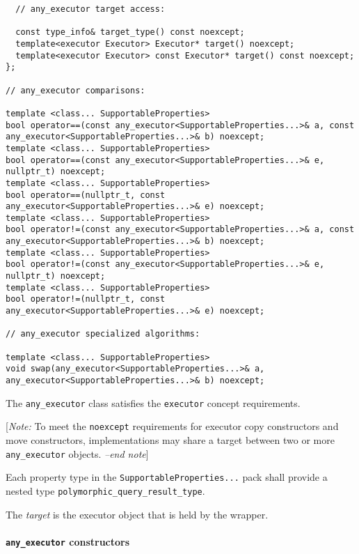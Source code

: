\documentclass[a4paper,12pt,notitlepage,twoside,openright]{article}
\begin{document}
\begin{verbatim}
  // any_executor target access:

  const type_info& target_type() const noexcept;
  template<executor Executor> Executor* target() noexcept;
  template<executor Executor> const Executor* target() const noexcept;
};

// any_executor comparisons:

template <class... SupportableProperties>
bool operator==(const any_executor<SupportableProperties...>& a, const any_executor<SupportableProperties...>& b) noexcept;
template <class... SupportableProperties>
bool operator==(const any_executor<SupportableProperties...>& e, nullptr_t) noexcept;
template <class... SupportableProperties>
bool operator==(nullptr_t, const any_executor<SupportableProperties...>& e) noexcept;
template <class... SupportableProperties>
bool operator!=(const any_executor<SupportableProperties...>& a, const any_executor<SupportableProperties...>& b) noexcept;
template <class... SupportableProperties>
bool operator!=(const any_executor<SupportableProperties...>& e, nullptr_t) noexcept;
template <class... SupportableProperties>
bool operator!=(nullptr_t, const any_executor<SupportableProperties...>& e) noexcept;

// any_executor specialized algorithms:

template <class... SupportableProperties>
void swap(any_executor<SupportableProperties...>& a, any_executor<SupportableProperties...>& b) noexcept;
\end{verbatim}

The \texttt{any_executor} class satisfies the
\texttt{executor} concept requirements.

{[}\emph{Note:} To meet the \texttt{noexcept} requirements
for executor copy constructors and move constructors, implementations
may share a target between two or more \texttt{any_executor}
objects. \emph{--end note}{]}

Each property type in the \texttt{SupportableProperties...}
pack shall provide a nested type
\texttt{polymorphic_query_result_type}.

The \emph{target} is the executor object that is held by the wrapper.

\hypertarget{any_executor-constructors}{%
\paragraph{\texorpdfstring{\texttt{any_executor}
constructors}{ constructors}}\label{any_executor-constructors}}
\end{document}
